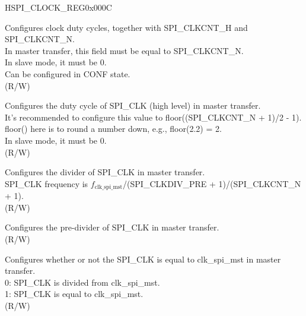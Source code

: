 \begin{register}{H}{SPI\_CLOCK\_REG}{0x000C}\label{regdesc:SPI3CLOCKREG}
%
%
%
%
%
%
\regnewline%
\begin{regdesc}\begin{reglist}
\label{fielddesc:SPI3CLKCNTL}\item [SPI\_CLKCNT\_L] Configures clock duty cycles, together with SPI\_CLKCNT\_H and SPI\_CLKCNT\_N.\\
In master transfer, this field must be equal to SPI\_CLKCNT\_N. \\
In slave mode, it must be 0. \\
Can be configured in CONF state.\\
(R/W)
\label{fielddesc:SPI3CLKCNTH}\item [SPI\_CLKCNT\_H] Configures the duty cycle of SPI\_CLK (high level) in master transfer.\\
It's recommended to configure this value to floor((SPI\_CLKCNT\_N + 1)/2 - 1). floor() here is to round a number down, e.g., floor(2.2) = 2. \\
In slave mode, it must be 0. \\
(R/W)
\label{fielddesc:SPI3CLKCNTN}\item [SPI\_CLKCNT\_N] Configures the divider of SPI\_CLK in master transfer.\\
SPI\_CLK frequency is $f_{\textrm{clk\_spi\_mst}}$/(SPI\_CLKDIV\_PRE + 1)/(SPI\_CLKCNT\_N + 1). \\
(R/W)
\label{fielddesc:SPI3CLKDIVPRE}\item [SPI\_CLKDIV\_PRE] Configures the pre-divider of SPI\_CLK in master transfer.
 \\
(R/W)
\label{fielddesc:SPI3CLKEQUSYSCLK}\item [SPI\_CLK\_EQU\_SYSCLK] Configures whether or not the SPI\_CLK is equal to clk\_spi\_mst in master transfer.\\
0: SPI\_CLK is divided from clk\_spi\_mst.\\
1: SPI\_CLK is equal to clk\_spi\_mst.\\
(R/W)
\end{reglist}\end{regdesc}
\end{register}


